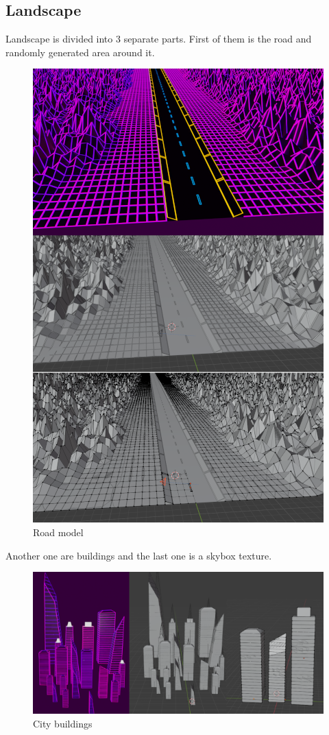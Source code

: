 \documentclass[12pt,a4paper,titlepage,final]{report}
\begin{document}
\subsection{Landscape}
Landscape is divided into 3 separate parts. First of them is the road and randomly generated area around it.
\begin{figure}[H]
    \centering
    \includegraphics[scale=1.3]{images/road_render_small.png}
    \caption{Road model}
    \label{fig:road_model}
\end{figure}

Another one are buildings and the last one is a skybox texture.

\begin{figure}[H]
    \centering
    \includegraphics[scale=1.3]{images/buildings_render_small.png}
    \caption{City buildings}
    \label{fig:city_scene}
\end{figure}
\end{document}
